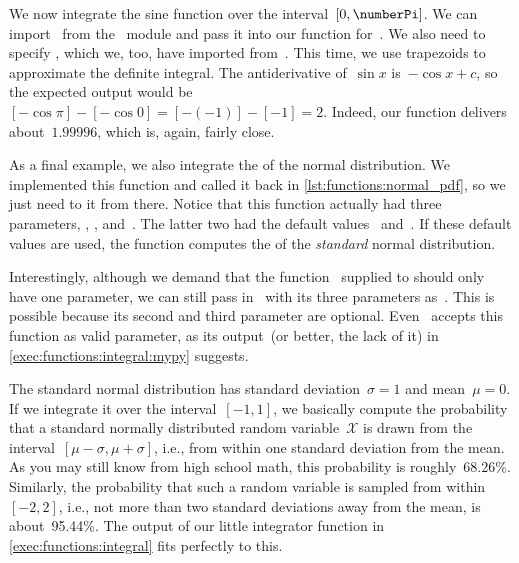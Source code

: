 We now integrate the sine function over the interval~$[0,\numberPi]$.
We can import~ from the ~module and pass it into our function for~.
We also need to specify , which we, too, have imported from~.
This time, we use  trapezoids to approximate the definite integral.
The antiderivative of~$\sin x$ is~$-\cos x+c$, so the expected output would be~$[-\cos\pi]-[-\cos 0]=[-(-1)]-[-1]=2$.
Indeed, our function delivers about~$1.99996$, which is, again, fairly close.

As a final example, we also integrate the  of the normal distribution.
We implemented this function and called it  back in \cref{lst:functions:normal_pdf}, so we just need to  it from there.
Notice that this function actually had three parameters, , , and~.
The latter two had the default values~ and~.
If these default values are used, the function computes the  of the \emph{standard} normal distribution.

%

Interestingly, although we demand that the function~ supplied to  should only have one parameter, we can still pass in~ with its three parameters as~.
This is possible because its second and third parameter are optional.
Even \mypy\ accepts this function as valid parameter, as its output~(or better, the lack of it) in \cref{exec:functions:integral:mypy} suggests.

The standard normal distribution has standard deviation~$\sigma=1$ and mean~$\mu=0$.
If we integrate it over the interval~$[-1,1]$, we basically compute the probability that a standard normally distributed random variable~${\mathcal{X}}$ is drawn from the interval~$[\mu-\sigma,\mu+\sigma]$, i.e., from within one standard deviation from the mean.
As you may still know from high school math, this probability is roughly~68.26\%.
Similarly, the probability that such a random variable is sampled from within~$[-2,2]$, i.e., not more than two standard deviations away from the mean, is about~95.44\%.
The output of our little integrator function in \cref{exec:functions:integral} fits perfectly to this.

